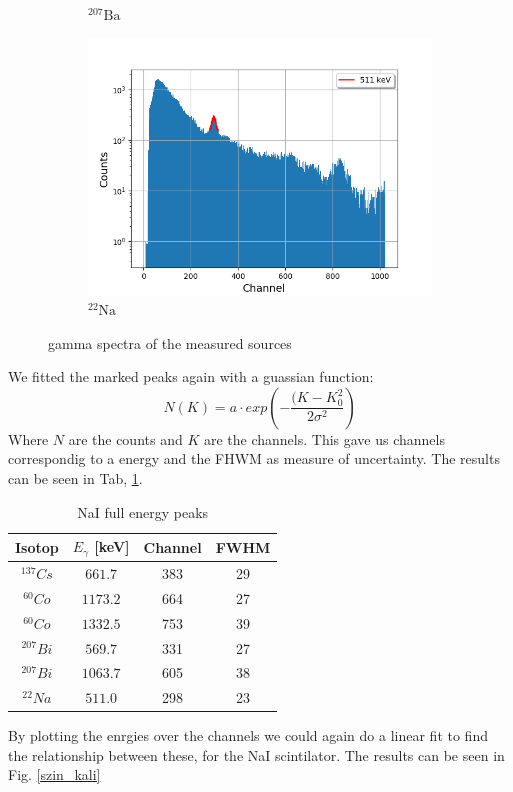 \begin{figure}[h]
\begin{subfigure}{.5\textwidth}
  \caption{$^{207}\text{Ba}$}
\end{subfigure}%
\begin{subfigure}{.5\textwidth}
  \centering
  \includegraphics[width=.9\linewidth]{../plots/szin_na.png}
  \caption{$^{22}\text{Na}$}
\end{subfigure}%
\caption{gamma spectra of the measured sources}
\label{szin}
\end{figure}

We fitted the marked peaks again with a guassian function:
\begin{equation}
N(K) = a \cdot exp \left( - \frac{(K - K_{0}^{2}}{2 \sigma ^{2}} \right)
\end {equation}
Where $N$ are the counts and $K$ are the channels.
This gave us channels correspondig to a energy and the FHWM as measure of uncertainty.
The results can be seen in Tab, \ref{szin_peaks}.

\begin{table}[h]
\centering
\begin{tabular}{c |c | c |c}
\hline
Isotop & $E_{\gamma}$ [keV]  & Channel & FWHM \\
\hline
$^{137}Cs$ & $661.7$ & 383 & 29 \\
$^{60}Co$ & $1173.2$ & 664 & 27 \\
$^{60}Co$ & $1332.5$ & 753 & 39 \\
$^{207}Bi$ & $569.7$   & 331 & 27 \\
$^{207}Bi$ & $1063.7$ & 605 & 38 \\
$^{22}Na$ & $511.0$   & 298 & 23 \\
\hline
\end{tabular}
\caption{NaI full energy peaks}
\label{szin_peaks}
\end{table}
By plotting the enrgies over the channels we could again do a linear fit to find the relationship between these, for the NaI scintilator.
The results can be seen in Fig. \ref{szin_kali}

